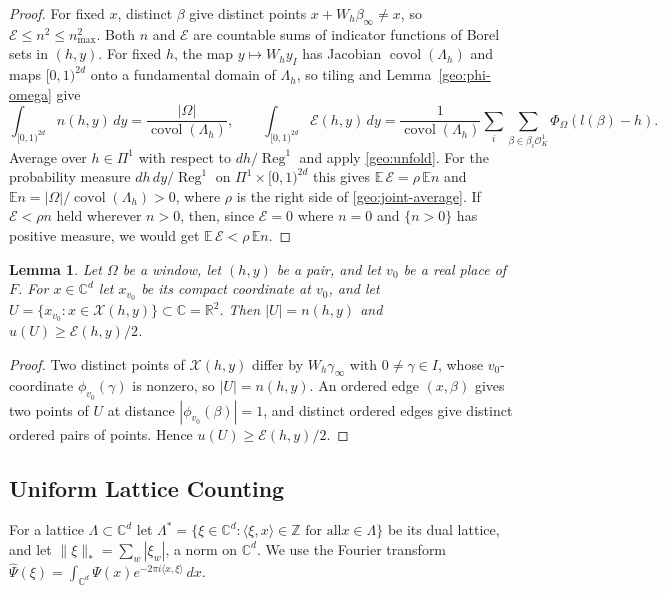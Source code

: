 \documentclass[11pt]{amsart}
\numberwithin{equation}{section}
\newtheorem{lemma}[equation]{Lemma}
\theoremstyle{definition}
\theoremstyle{remark}
\DeclareMathOperator{\covol}{covol}
\newcommand{\R}{\mathbb R}
\newcommand{\C}{\mathbb C}
\newcommand{\Z}{\mathbb Z}
\begin{document}
\begin{proof}
For fixed $x$, distinct $\beta$ give distinct points
$x+W_h\beta_\infty\ne x$, so $\mathcal E\le n^2\le n_{\max}^2$. Both $n$
and $\mathcal E$ are countable sums of indicator functions of Borel sets
in $(h,y)$. For fixed $h$, the map $y\mapsto W_hy_I$ has Jacobian
$\covol(\Lambda_h)$ and maps $[0,1)^{2d}$ onto a fundamental domain of
$\Lambda_h$, so tiling and Lemma~\ref{geo:phi-omega} give
\[
 \int_{[0,1)^{2d}}n(h,y)\,dy=\frac{|\Omega|}{\covol(\Lambda_h)},\qquad
 \int_{[0,1)^{2d}}\mathcal E(h,y)\,dy
 =\frac1{\covol(\Lambda_h)}\sum_{i}\sum_{\beta\in\beta_i\mathcal O_K^1}
 \Phi_\Omega(l(\beta)-h).
\]
Average over $h\in\Pi^1$ with respect to $dh/\operatorname{Reg}^1$ and
apply \eqref{geo:unfold}. For the probability measure
$dh\,dy/\operatorname{Reg}^1$ on $\Pi^1\times[0,1)^{2d}$ this gives
$\mathbb E\,\mathcal E=\rho\,\mathbb En$ and
$\mathbb En=|\Omega|/\covol(\Lambda_h)>0$, where $\rho$ is the right
side of \eqref{geo:joint-average}. If $\mathcal E<\rho n$ held wherever
$n>0$, then, since $\mathcal E=0$ where $n=0$ and $\{n>0\}$ has positive
measure, we would get $\mathbb E\,\mathcal E<\rho\,\mathbb En$.
\end{proof}

\begin{lemma}\label{geo:planar}
Let $\Omega$ be a window, let $(h,y)$ be a pair, and let $v_0$ be a real
place of $F$. For $x\in\C^d$ let $x_{v_0}$ be its compact coordinate at
$v_0$, and let $U=\{x_{v_0}:x\in\mathcal X(h,y)\}\subset\C=\R^2$. Then
$|U|=n(h,y)$ and $u(U)\ge\mathcal E(h,y)/2$.
\end{lemma}

\begin{proof}
Two distinct points of $\mathcal X(h,y)$ differ by $W_h\gamma_\infty$
with $0\ne\gamma\in I$, whose $v_0$-coordinate $\phi_{v_0}(\gamma)$ is
nonzero, so $|U|=n(h,y)$. An ordered edge $(x,\beta)$ gives two points of
$U$ at distance $|\phi_{v_0}(\beta)|=1$, and distinct ordered edges give
distinct ordered pairs of points. Hence $u(U)\ge\mathcal E(h,y)/2$.
\end{proof}

\subsection{Uniform Lattice Counting}
For a lattice $\Lambda\subset\C^d$ let
$\Lambda^*=\{\xi\in\C^d:\langle\xi,x\rangle\in\Z\text{ for all
}x\in\Lambda\}$ be its dual lattice, and let
$\|\xi\|_*=\sum_w|\xi_w|$, a norm on $\C^d$. We use the Fourier
transform $\widehat\Psi(\xi)=\int_{\C^d}\Psi(x)e^{-2\pi i\langle
x,\xi\rangle}\,dx$.
\end{document}
